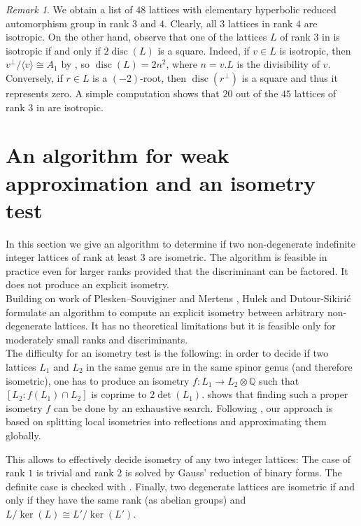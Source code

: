 \documentclass[11pt,letterpaper]{amsart}
\DeclareMathOperator{\disc}{disc}
\newcommand{\QQ}{\mathbb{Q}}
\theoremstyle{definition}
\theoremstyle{remark}
\newtheorem{remark}[theorem]{Remark}
\begin{document}
\begin{remark}
We obtain a list of $48$ lattices with elementary hyperbolic reduced automorphism group in rank $3$ and $4$. Clearly, all $3$ lattices in rank $4$ are isotropic. On the other hand, observe that one of the lattices $L$ of rank $3$ in  is isotropic if and only if $2\disc(L)$ is a square. Indeed, if $v\in L$ is isotropic, then $v^\perp/\langle v \rangle \cong A_1$ by , so $\disc(L) = 2n^2$, where $n=v.L$ is the divisibility of $v$. Conversely, if $r\in L$ is a $(-2)$-root, then $\disc(r^\perp)$ is a square and thus it represents zero. A simple computation shows that $20$ out of the $45$ lattices of rank $3$ in  are isotropic.
\end{remark}


\appendix

\section{An algorithm for weak approximation and an isometry test}\label{appendix}

In this section we give an algorithm to determine if two non-degenerate indefinite integer lattices of rank at least $3$ are isometric. The algorithm is feasible in practice even for larger ranks provided that the discriminant can be factored. It does not produce an explicit isometry.\\
Building on work of Plesken--Souviginer \cite{plesken.souvignier} and Mertens \cite{mertens2014}, Hulek and Dutour-Sikirić \cite{hulek-doutour2024} formulate an algorithm to compute an explicit isometry between arbitrary non-degenerate lattices. It has no theoretical limitations but it is feasible only for moderately small ranks and discriminants.\\


The difficulty for an isometry test is the following: in order to decide if two lattices $L_1$ and $L_2$ in the same genus are in the same spinor genus (and therefore isometric), one has to produce an isometry 
$f\colon L_1 \to L_2 \otimes \QQ$ such that $[L_2:f(L_1) \cap L_2]$ is coprime to $2\det(L_1)$.
\Cite{chan.gao.weak.approx} shows that finding such a proper isometry $f$ can be done by an exhaustive search.
Following \cite[101:7]{meara.quadratic}, our approach is based on splitting local isometries into reflections and approximating them globally.

This allows to effectively decide isometry of any two integer lattices:
The case of rank $1$ is trivial and rank $2$ is solved by Gauss' reduction of binary forms. The  definite case is checked with \cite{plesken.souvignier}. Finally, two degenerate lattices are isometric if and only if they have the same rank (as abelian groups) and $L/\ker(L) \cong L'/\ker(L')$.
\end{document}
